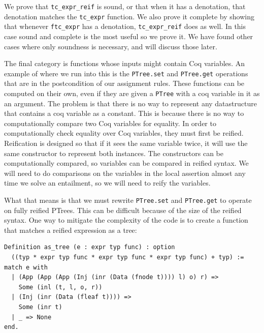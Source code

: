\documentclass{puthesis}
\begin{document}
We prove that \lstinline|tc_expr_reif| is sound, or that when it has a
denotation, that denotation matches the \lstinline|tc_expr|
function. We also prove it complete by showing that whenever
\lstinline|ftc_expr| has a denotation, \lstinline|tc_expr_reif| does
as well.  In this case sound and complete is the most useful so we
prove it. We have found other cases where only soundness is necessary,
and will discuss those later.

The final category is functions whose inputs might contain Coq
variables. An example of where we run into this is the
\lstinline|PTree.set| and \lstinline|PTree.get| operations that are in
the postcondition of our assignment rules. These functions can be
computed on their own, even if they are given a \lstinline|PTree| with
a coq variable in it as an argument. The problem is that there is no
way to represent any datastructure that contains a coq variable as a
constant. This is because there is no way to computationally compare
two Coq variables for equality. In order to computationally check
equality over Coq variables, they must first be reified.  Reification
is designed so that if it sees the same variable twice, it will use
the same constructor to represent both instances. The constructors can
be computationally compared, so variables can be compared in reified
syntax.  We will need to do comparisons on the variables in the local
assertion almost any time we solve an entailment, so we will need to
reify the variables.

What that means is that we must rewrite \lstinline|PTree.set| and
\lstinline|PTree.get| to operate on fully reified PTrees. This can be
difficult because of the size of the reified syntax. One way to
mitigate the complexity of the code is to create a function that
matches a reified expression as a tree:

\begin{verbatim}
Definition as_tree (e : expr typ func) : option
  ((typ * expr typ func * expr typ func * expr typ func) + typ) := 
match e with
  | (App (App (App (Inj (inr (Data (fnode t)))) l) o) r) =>
    Some (inl (t, l, o, r))
  | (Inj (inr (Data (fleaf t)))) =>
    Some (inr t)
  | _ => None
end.
\end{verbatim}
\end{document}

